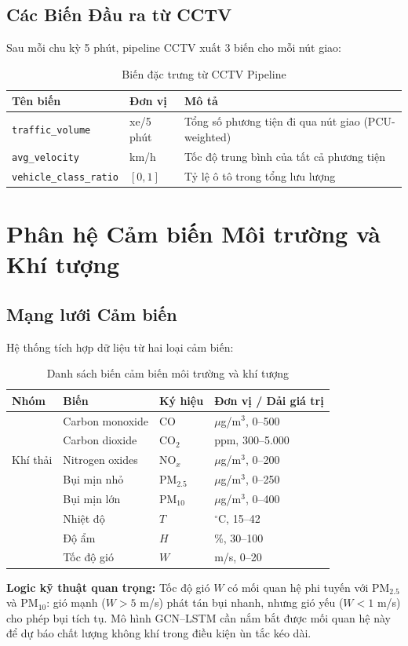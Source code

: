 \subsection{Các Biến Đầu ra từ CCTV}
Sau mỗi chu kỳ 5 phút, pipeline CCTV xuất 3 biến cho mỗi nút giao:
\begin{table}[H]
\centering
\caption{Biến đặc trưng từ CCTV Pipeline}
\label{tab:cctv_features}
\renewcommand{\arraystretch}{1.4}
\begin{tabular}{p{3.5cm} p{2.5cm} p{6cm}}
\toprule
\textbf{Tên biến} & \textbf{Đơn vị} & \textbf{Mô tả} \\
\midrule
\texttt{traffic\_volume} & xe/5 phút & Tổng số phương tiện đi qua nút giao (PCU-weighted) \\
\rowcolor{rowgray}
\texttt{avg\_velocity} & km/h & Tốc độ trung bình của tất cả phương tiện \\
\texttt{vehicle\_class\_ratio} & $[0,1]$ & Tỷ lệ ô tô trong tổng lưu lượng \\
\bottomrule
\end{tabular}
\end{table}
\section{Phân hệ Cảm biến Môi trường và Khí tượng}
\subsection{Mạng lưới Cảm biến}
Hệ thống tích hợp dữ liệu từ hai loại cảm biến:
\begin{table}[H]
\centering
\caption{Danh sách biến cảm biến môi trường và khí tượng}
\label{tab:sensors}
\renewcommand{\arraystretch}{1.4}
\begin{tabular}{p{2cm} p{3.2cm} p{2.5cm} p{4cm}}
\toprule
\textbf{Nhóm} & \textbf{Biến} & \textbf{Ký hiệu} & \textbf{Đơn vị / Dải giá trị} \\
\midrule
\multirow{5}{*}{Khí thải} & Carbon monoxide & CO & $\mu$g/m$^3$, 0--500 \\
  & Carbon dioxide & CO$_2$ & ppm, 300--5.000 \\
  & Nitrogen oxides & NO$_x$ & $\mu$g/m$^3$, 0--200 \\
  & Bụi mịn nhỏ & PM$_{2.5}$ & $\mu$g/m$^3$, 0--250 \\
  & Bụi mịn lớn & PM$_{10}$ & $\mu$g/m$^3$, 0--400 \\
\midrule
\rowcolor{rowgray}
\multirow{3}{*}{Khí tượng} & Nhiệt độ & $T$ & $^\circ$C, 15--42 \\
\rowcolor{rowgray}
  & Độ ẩm & $H$ & \%, 30--100 \\
\rowcolor{rowgray}
  & Tốc độ gió & $W$ & m/s, 0--20 \\
\bottomrule
\end{tabular}
\end{table}
\begin{tcolorbox}[tipbox]
\textbf{Logic kỹ thuật quan trọng:} Tốc độ gió $W$ có mối quan hệ phi tuyến với PM$_{2.5}$ và PM$_{10}$: gió mạnh ($W > 5$ m/s) phát tán bụi nhanh, nhưng gió yếu ($W < 1$ m/s) cho phép bụi tích tụ. Mô hình GCN--LSTM cần nắm bắt được mối quan hệ này để dự báo chất lượng không khí trong điều kiện ùn tắc kéo dài.
\end{tcolorbox}
